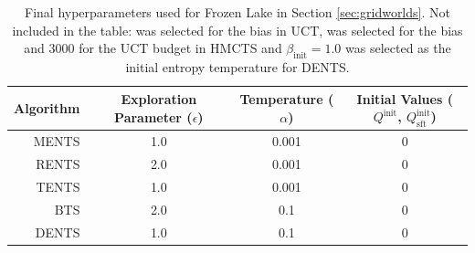     \begin{table}[]
        \centering
        \begin{tabular}{r|ccc} 
            Algorithm   & Exploration Parameter ($\epsilon$)    & Temperature ($\alpha$)    & Initial Values ($Q^{\text{init}}$, $Q^{\text{init}}_{\text{sft}}$)    \\
            \hline
            MENTS       & 1.0                                   & 0.001                     & 0                                                                     \\
            RENTS       & 2.0                                   & 0.001                     & 0                                                                     \\
            TENTS       & 1.0                                   & 0.001                     & 0                                                                     \\
            BTS         & 2.0                                   & 0.1                       & 0                                                                     \\
            DENTS       & 1.0                                   & 0.1                       & 0                                                                     \\
        \end{tabular}
        \caption[Final hyperparameters used for Frozen Lake in Section \ref{sec:gridworlds}]{Final hyperparameters used for Frozen Lake in Section \ref{sec:gridworlds}. Not included in the table: %
        was selected for the bias in UCT, %
        was selected for the bias and 3000 for the UCT budget in HMCTS and $\beta_{\text{init}}=1.0$ was selected as the initial entropy temperature for DENTS. \label{table:hyper_fl}}
    \end{table}

